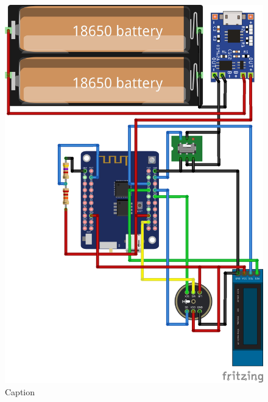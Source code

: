 \documentclass[a4paper, 12pt]{book}
\begin{document}
\begin{figure}[H]
    \centering
    \includegraphics[width=\linewidth]{slikovno_gradivo/merilna_enota_bb.png}
    \caption{Caption}
    \label{fig:INMP441}
\end{figure}
\end{document}
